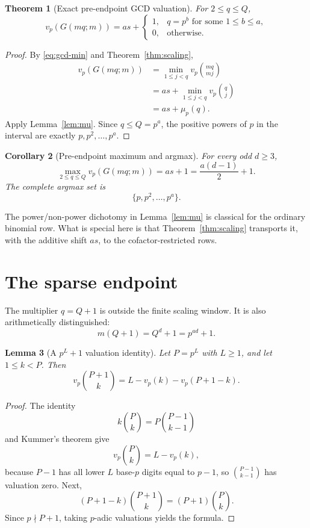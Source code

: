\documentclass[11pt]{article}
\newtheorem{theorem}{Theorem}[section]
\newtheorem{lemma}[theorem]{Lemma}
\newtheorem{corollary}[theorem]{Corollary}
\theoremstyle{definition}
\theoremstyle{remark}
\begin{document}
\begin{theorem}[Exact pre-endpoint GCD valuation]\label{thm:gcd-window}
For \(2\le q\le Q\),
\[
  v_p(G(mq;m))
  =
  as+
  \begin{cases}
    1,&q=p^b\text{ for some }1\le b\le a,\\
    0,&\text{otherwise}.
  \end{cases}
\]
\end{theorem}

\begin{proof}
By \eqref{eq:gcd-min} and Theorem~\ref{thm:scaling},
\[
\begin{aligned}
  v_p(G(mq;m))
  &=
  \min_{1\le j<q}v_p\binom{mq}{mj}\\
  &=
  as+\min_{1\le j<q}v_p\binom qj\\
  &=
  as+\mu_p(q).
\end{aligned}
\]
Apply Lemma~\ref{lem:mu}.  Since \(q\le Q=p^a\), the positive powers of \(p\)
in the interval are exactly \(p,p^2,\ldots,p^a\).
\end{proof}

\begin{corollary}[Pre-endpoint maximum and argmax]\label{cor:gcd-max}
For every odd \(d\ge3\),
\[
  \max_{2\le q\le Q}v_p(G(mq;m))
  =
  as+1
  =
  \frac{a(d-1)}2+1.
\]
The complete argmax set is
\[
  \{p,p^2,\ldots,p^a\}.
\]
\end{corollary}

The power/non-power dichotomy in Lemma~\ref{lem:mu} is classical for the
ordinary binomial row.  What is special here is that
Theorem~\ref{thm:scaling} transports it, with the additive shift \(as\), to
the cofactor-restricted rows.

\section{The sparse endpoint}\label{sec:endpoint}

The multiplier \(q=Q+1\) is outside the finite scaling window.  It is also
arithmetically distinguished:
\[
  m(Q+1)=Q^d+1=p^{ad}+1.
\]

\begin{lemma}[A \(p^L+1\) valuation identity]\label{lem:plus-one}
Let \(P=p^L\) with \(L\ge1\), and let \(1\le k<P\).  Then
\[
  v_p\binom{P+1}{k}
  =
  L-v_p(k)-v_p(P+1-k).
\]
\end{lemma}

\begin{proof}
The identity
\[
  k\binom Pk=P\binom{P-1}{k-1}
\]
and Kummer's theorem give
\[
  v_p\binom Pk=L-v_p(k),
\]
because \(P-1\) has all lower \(L\) base-\(p\) digits equal to \(p-1\), so
\(\binom{P-1}{k-1}\) has valuation zero.  Next,
\[
  (P+1-k)\binom{P+1}{k}=(P+1)\binom Pk.
\]
Since \(p\nmid P+1\), taking \(p\)-adic valuations yields the formula.
\end{proof}
\end{document}
